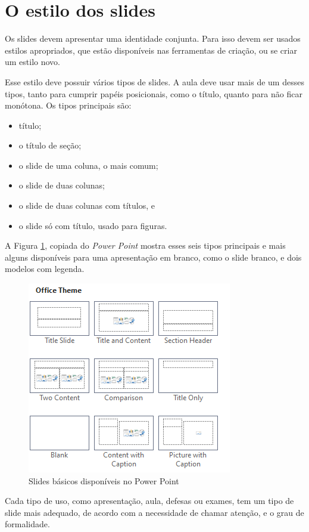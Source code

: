 \section{O estilo dos slides}

Os slides devem apresentar uma identidade conjunta. Para isso devem ser usados estilos apropriados, que estão disponíveis nas ferramentas de criação, ou se criar um estilo novo.

Esse estilo deve possuir vários tipos de slides. A aula deve usar mais de um desses tipos, tanto para cumprir papéis posicionais, como o título, quanto para não ficar monótona. Os tipos principais são:
\begin{itemize}
    \item título;
    \item o título de seção;
    \item o slide de uma coluna, o mais comum;
    \item o slide de duas colunas;
    \item o slide de duas colunas com títulos, e
    \item o slide só com título, usado para figuras.
\end{itemize}


A Figura \ref{fig:tiposbasicosdopp}, copiada do \textit{Power Point} mostra esses seis tipos principais e mais alguns disponíveis para uma apresentação em branco, como o slide branco, e dois modelos com legenda.

\begin{figure}[htb]
    \centering
    \includegraphics[width=0.5\linewidth]{imagens/tiposbasicosdopp}
    \caption{Slides básicos disponíveis no Power Point}
    \label{fig:tiposbasicosdopp}
\end{figure}

Cada tipo de uso, como apresentação, aula, defesas ou exames, tem um tipo de slide mais adequado, de acordo com a necessidade de chamar atenção, e o grau de formalidade.

